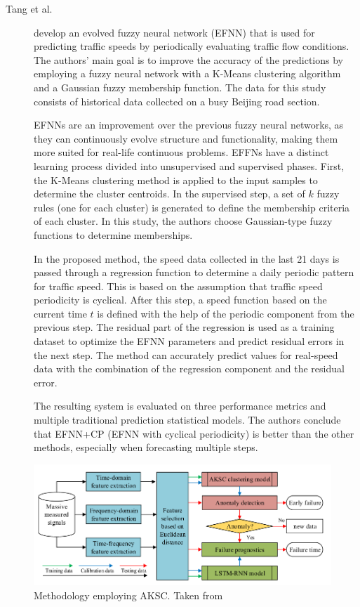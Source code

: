 \begin{description}
    \item[Tang et al.]\cite{Tang.Liu.ea_ImprovedFuzzyNeural_2017} develop an evolved fuzzy neural network (EFNN) that is used for predicting traffic speeds by periodically evaluating traffic flow conditions. The authors' main goal is to improve the accuracy of the predictions by employing a fuzzy neural network with a K-Means clustering algorithm and a Gaussian fuzzy membership function. The data for this study consists of historical data collected on a busy Beijing road section. 
    
    EFNNs are an improvement over the previous fuzzy neural networks, as they can continuously evolve structure and functionality, making them more suited for real-life continuous problems. EFFNs have a distinct learning process divided into unsupervised and supervised phases. First, the K-Means clustering method is applied to the input samples to determine the cluster centroids. In the supervised step, a set of $k$ fuzzy rules (one for each cluster) is generated to define the membership criteria of each cluster. In this study, the authors choose Gaussian-type fuzzy functions to determine memberships.

    In the proposed method, the speed data collected in the last 21 days is passed through a regression function to determine a daily periodic pattern for traffic speed. This is based on the assumption that traffic speed periodicity is cyclical. After this step, a speed function based on the current time $t$ is defined with the help of the periodic component from the previous step. The residual part of the regression is used as a training dataset to optimize the EFNN parameters and predict residual errors in the next step. The method can accurately predict values for real-speed data with the combination of the regression component and the residual error.

    The resulting system is evaluated on three performance metrics and multiple traditional prediction statistical models. The authors conclude that EFNN+CP (EFNN with cyclical periodicity) is better than the other methods, especially when forecasting multiple steps.
\end{description}


\begin{figure}[]
    \centering
    \includegraphics[width=\textwidth]{figures/aksc_arch.png}
    \caption{Methodology employing AKSC. Taken from \cite{Cheng.Zhu.ea_MachineHealthMonitoring_2019}}
    \label{fig:aksc}
\end{figure}

